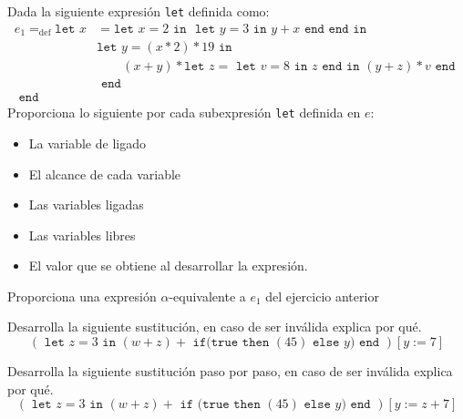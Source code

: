     \begin{exercise}
        Dada la siguiente expresión \texttt{let} definida como:
        \begin{align*}
        	e_1=_{\text{def}}\texttt{let  }
        		x&= \texttt{let }x = 2 \texttt{ in } \texttt{ let } y = 3 \texttt{ in } y + x \texttt{ end } \texttt{end}
        		\texttt{ in }\\
        		 &\texttt{let }y=(x \ast 2) \ast 19 
        		 	\texttt{ in } \\
        		 & \qquad(x + y) \ast \texttt{let } z = \texttt{ let } v = 8 \texttt{ in } z \texttt{ end} \texttt{ in } 
        		 						(y + z) \ast v 
        		 				\texttt{ end }\\
        		 &\texttt{ end }\\
        	\texttt{ end }&
        \end{align*}
        Proporciona lo siguiente por cada subexpresión \texttt{let} definida en $e$:
        \begin{itemize}
	 \item La variable de ligado
            \item El alcance de cada variable
            \item Las variables ligadas
	 \item Las variables libres
            \item El valor que se obtiene al desarrollar la expresión.
        \end{itemize}
    \end{exercise}

\bigskip
    
    \begin{exercise}
        Proporciona una expresión $\alpha$-equivalente a $e_1$ del ejercicio anterior 
    \end{exercise}

    \bigskip
    
    
    \begin{exercise}
         Desarrolla la siguiente sustitución, en caso de ser inválida explica por qué.
         \[
        (\texttt{ let } z = 3 \texttt{ in } (w + z) + \texttt{ if(} \texttt{true} \texttt{ then } (45) \texttt{ else } y \texttt{) } \texttt{end }) [y:=7]
         \]
    \end{exercise}

    \bigskip
    
    \begin{exercise}
        Desarrolla la siguiente sustitución paso por paso, en caso de ser inválida explica por qué. 
        \[
            (\texttt{ let } z = 3 \texttt{ in } (w + z) + \texttt{ if (} \texttt{true} \texttt{ then } (45) \texttt{ else } y \texttt{)} \texttt{ end }) [y:=z+7]
        \]
    \end{exercise}

